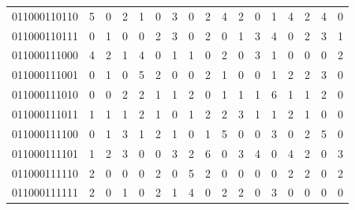 \documentclass[10pt,a4paper]{article}
\begin{document}
\begin{longtable}{ |c|c|c|c|c|c|c|c|c|c|c|c|c|c|c|c|c| }
    011000110110              & 5                            & 0                                & 2                            & 1                              & 0   & 3   & 0   & 2   & 4   & 2   & 0   & 1   & 4   & 2   & 4   & 0   \\
    011000110111              & 0                            & 1                                & 0                            & 0                              & 2   & 3   & 0   & 2   & 0   & 1   & 3   & 4   & 0   & 2   & 3   & 1   \\
    011000111000              & 4                            & 2                                & 1                            & 4                              & 0   & 1   & 1   & 0   & 2   & 0   & 3   & 1   & 0   & 0   & 0   & 2   \\
    011000111001              & 0                            & 1                                & 0                            & 5                              & 2   & 0   & 0   & 2   & 1   & 0   & 0   & 1   & 2   & 2   & 3   & 0   \\
    011000111010              & 0                            & 0                                & 2                            & 2                              & 1   & 1   & 2   & 0   & 1   & 1   & 1   & 6   & 1   & 1   & 2   & 0   \\
    011000111011              & 1                            & 1                                & 1                            & 2                              & 1   & 0   & 1   & 2   & 2   & 3   & 1   & 1   & 2   & 1   & 0   & 0   \\
    011000111100              & 0                            & 1                                & 3                            & 1                              & 2   & 1   & 0   & 1   & 5   & 0   & 0   & 3   & 0   & 2   & 5   & 0   \\
    011000111101              & 1                            & 2                                & 3                            & 0                              & 0   & 3   & 2   & 6   & 0   & 3   & 4   & 0   & 4   & 2   & 0   & 3   \\
    011000111110              & 2                            & 0                                & 0                            & 0                              & 2   & 0   & 5   & 2   & 0   & 0   & 0   & 0   & 2   & 2   & 0   & 2   \\
    011000111111              & 2                            & 0                                & 1                            & 0                              & 2   & 1   & 4   & 0   & 2   & 2   & 0   & 3   & 0   & 0   & 0   & 0   \\

\end{longtable}
\end{document}
